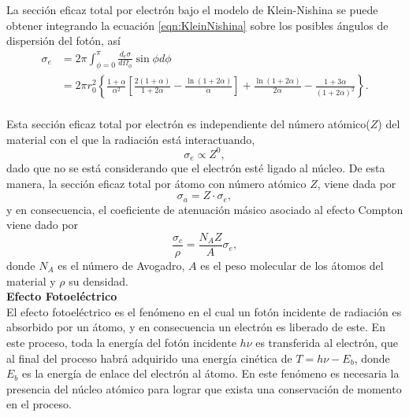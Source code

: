 La sección eficaz total por electrón bajo el modelo de Klein-Nishina se puede obtener integrando la ecuación \eqref{eqn:KleinNishina} sobre los posibles ángulos de dispersión del fotón, así
\begin{equation}
\begin{split}
\sigma_{e}&=2 \pi \int_{\phi=0}^{\pi} \frac{d_{e} \sigma}{d \Omega_{\phi}} \sin \phi d \phi\\
&=2 \pi r_{0}^{2}\left\{\frac{1+\alpha}{\alpha^{2}}\left[\frac{2(1+\alpha)}{1+2 \alpha}-\frac{\ln (1+2 \alpha)}{\alpha}\right]+\frac{\ln (1+2 \alpha)}{2 \alpha}-\frac{1+3 \alpha}{(1+2 \alpha)^{2}}\right\}.
\end{split}
\end{equation}
\\

Esta sección eficaz total por electrón es independiente del número atómico($Z$) del material con el que la radiación está interactuando,
\begin{equation}
	\sigma_{e}\propto Z^0,
\end{equation}
dado que no se está considerando que el electrón esté ligado al núcleo. De esta manera, la sección eficaz total por átomo con número atómico $Z$, viene dada por 
\begin{equation}
	\sigma_{a}=Z\cdot\sigma_{e},
\end{equation}
y en consecuencia, el coeficiente de atenuación másico asociado al efecto Compton viene dado por 
\begin{equation}
	\frac{\sigma_c}{\rho}=\frac{N_{A}Z}{A} \sigma_{e},
\end{equation} 
donde $N_A$ es el número de Avogadro, $A$ es el peso molecular de los átomos del material y $\rho$ su densidad.\\

\textbf{Efecto Fotoeléctrico}\\

El efecto fotoeléctrico es el fenómeno en el cual un fotón incidente de radiación es absorbido por un átomo, y en consecuencia un electrón es liberado de este. En este proceso, toda la energía del fotón incidente $h\nu$ es transferida al electrón, que al final del proceso habrá adquirido una energía cinética de $T=h\nu-E_b$, donde $E_b$ es la energía de enlace del electrón al átomo. En este fenómeno es necesaria la presencia del núcleo atómico para lograr que exista una conservación de momento en el proceso. \\

